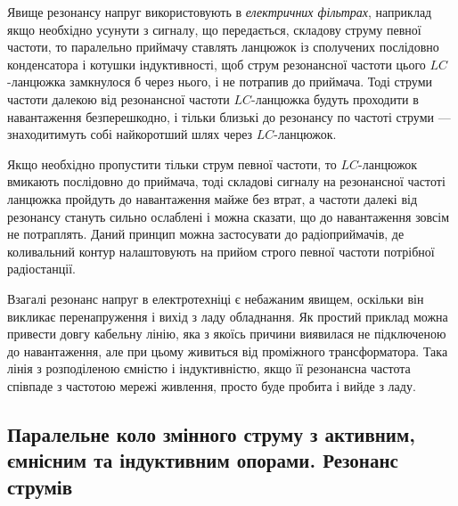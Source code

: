 \documentclass[]{LabWork}
\begin{document}
\noindent\bigskip%
\begin{More}

	Явище резонансу напруг використовують в \emph{електричних фільтрах}, наприклад якщо необхідно усунути з сигналу, що передається, складову струму певної частоти, то паралельно приймачу ставлять ланцюжок із сполучених послідовно конденсатора і котушки індуктивності, щоб струм резонансної частоти цього $LC$-ланцюжка замкнулося б через нього, і не потрапив до приймача. Тоді струми частоти далекою від резонансної частоти $LC$-ланцюжка будуть проходити в навантаження безперешкодно, і тільки близькі до резонансу по частоті струми --- знаходитимуть собі найкоротший шлях через $LC$-ланцюжок.

	Якщо необхідно пропустити тільки струм певної частоти, то $LC$-ланцюжок вмикають послідовно до приймача, тоді складові сигналу на резонансної частоті ланцюжка пройдуть до навантаження майже без втрат, а частоти далекі від резонансу стануть сильно ослаблені і можна сказати, що до навантаження зовсім не потраплять. Даний принцип можна застосувати до радіоприймачів, де коливальний контур налаштовують на прийом строго певної частоти потрібної радіостанції.

	Взагалі резонанс напруг в електротехніці є небажаним явищем, оскільки він викликає перенапруження і вихід з ладу обладнання. Як простий приклад можна привести довгу кабельну лінію, яка з якоїсь причини виявилася не підключеною до навантаження, але при цьому живиться від проміжного трансформатора. Така лінія з розподіленою ємністю і індуктивністю, якщо її резонансна частота співпаде з частотою мережі живлення, просто буде пробита і вийде з ладу.


\end{More}

\subsection{Паралельне коло змінного струму з активним, ємнісним та індуктивним опорами. Резонанс струмів}
\end{document}
